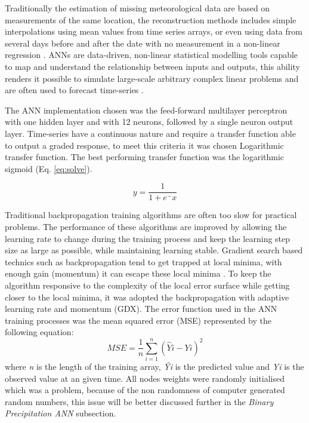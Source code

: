 Traditionally the estimation of missing meteorological data are based on measurements of the same location, the reconstruction methods includes simple interpolations using mean values from time series arrays, or even using data from several days before and after the date with no measurement in a non-linear regression \cite{kim2010reconstructing}. ANNs are data-driven, non-linear statistical modelling tools capable to map and understand the relationship  between inputs and outputs, this ability renders it possible to simulate large-scale arbitrary complex linear problems \cite{wu2006flood} and are often used to forecast time-series \cite{zhang2003time, box1976time, french1992rainfall, zhang1998linear}.

The ANN implementation chosen was the feed-forward multilayer perceptron with one hidden layer and with 12 neurons, followed by a single neuron output layer. Time-series have a continuous nature and require a transfer function able to output a graded response, to meet this criteria it was chosen Logarithmic transfer function. The best performing transfer function was the logarithmic sigmoid (Eq. \ref{eq:solve}).

\begin{equation}
\label{eq:solve}
y = \frac{1}{1 + e^-x}
\end{equation}

Traditional backpropagation training algorithms are often too slow for practical problems. The performance of these algorithms are improved by allowing the learning rate to change during the training process and keep the learning step size as large as possible, while maintaining learning stable. Gradient search based technics such as backpropagation tend to get trapped at local minima, with enough gain (momentum) it can escape these local minima \cite{montana1989training}. To keep the algorithm responsive to the complexity of the local error surface while getting closer to the local minima, it was adopted the backpropagation with adaptive learning rate and momentum (GDX). The error function used in the ANN training processes was the mean squared error (MSE) represented by the following equation:
\begin{equation}
\label{eq:solve2}
MSE = \frac{1}{n} \sum\limits_{i=1}^n (\hat{Y}i - Yi)^2
\end{equation}
where \textit{n} is the length of the training array, \textit{\^{Y}}\textit{i} is the predicted value and \textit{Yi} is the observed value at an given time. 
All nodes weights were randomly initialised which was a problem, because of the non randomness of computer generated random numbers, this issue will be better
discussed further in the \textit{Binary Precipitation ANN} subsection. 

